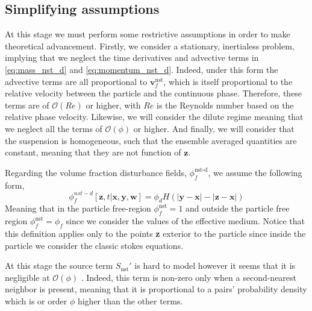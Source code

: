 \subsection{Simplifying assumptions}

At this stage we must perform some restrictive assumptions in order to make theoretical advancement. 
Firstly, we consider a stationary, inertialess problem, implying that we neglect the time derivatives and advective terms in \ref{eq:mass_nst_d} and \ref{eq:momentum_nst_d}. 
Indeed, under this form the advective terms are all proportional to $\textbf{v}_f^\text{nst}$, which is itself proportional to the relative velocity between the particle and the continuous phase. 
Therefore, these terms are of $\mathcal{O}(Re)$ or higher, with $Re$ is the Reynolds number based on the relative phase velocity. 
Likewise, we will consider the dilute regime meaning that we neglect all the terms of $\mathcal{O}(\phi)$ or higher. 
And finally, we will consider that the suspension is homogeneous, such that the ensemble averaged quantities are constant, meaning that they are not function of $\textbf{z}$. 


Regarding the volume fraction disturbance fields, $\phi_f^\text{nst-d}$, we assume the following form, 
\begin{equation*}
    \phi_f^{nst-d}[\textbf{z},t|\textbf{x},\textbf{y},\textbf{w}]
    = \phi_d H(|\textbf{y} - \textbf{x}| - |\textbf{z} - \textbf{x}|)
\end{equation*}
Meaning that in the particle free-region $\phi_f^\text{nst} = 1$ and outside the particle free region $\phi_f^\text{nst} = \phi_f$ since we consider the values of the effective medium. 
Notice that this definition applies only to the points \textbf{z} exterior to the particle since inside the particle we consider the classic stokes equations. 

At this stage the source term $S_\text{nst}'$ is hard to model however it seems that it is negligible at $\mathcal{O}(\phi)$ \citet{zhang2021ensemble}. 
Indeed, this term is non-zero only when a second-nearest neighbor is present, meaning that it is proportional to a pairs' probability density which is or order $\phi$ higher than the other terms. 

